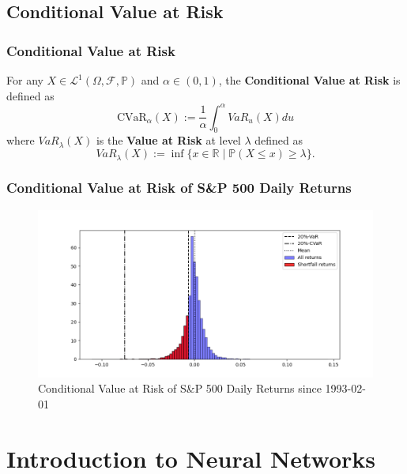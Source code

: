\documentclass[serif]{beamer}
\def\R{{\mathbb R}}
\def\P{{\mathbb P}}
\def\O{{\Omega}}
\def\cF{{\mathcal F}}
\def\L{{\mathcal L}}
\begin{document}
\subsection{Conditional Value at Risk}

\begin{frame}
    \frametitle{Conditional Value at Risk}
    For any $X \in \L^1 (\O, \cF, \P)$ and $\alpha \in (0,1)$,
    the \textbf{Conditional Value at Risk}
    is defined as
    $$\text{CVaR}_\alpha (X) := \frac{1}{\alpha} \int_0^\alpha VaR_u (X) du$$
    where $VaR_\lambda (X)$ is the \textbf{Value at Risk} at level $\lambda$ defined as
    $$VaR_\lambda (X) := \inf \{ x \in \R \; | \; \P (X \leq x) \geq \lambda \}.$$
\end{frame}

\begin{frame}
    \frametitle{Conditional Value at Risk of S\&P 500 Daily Returns}
    \begin{figure}
        \includegraphics[width=1.0\textwidth]{./images/cvar_sp500_example.png}
        \caption{Conditional Value at Risk of S\&P 500 Daily Returns since 1993-02-01}
    \end{figure}
\end{frame}

\section{Introduction to Neural Networks}
\end{document}
